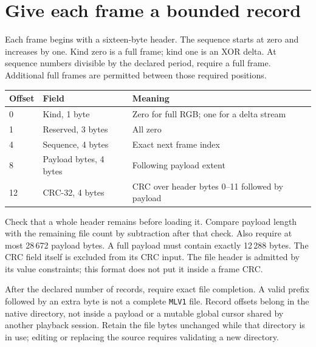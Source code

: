 \section{Give each frame a bounded record}
Each frame begins with a sixteen-byte header. The sequence starts at zero and
increases by one. Kind zero is a full frame; kind one is an XOR delta. At sequence
numbers divisible by the declared period, require a full frame. Additional full
frames are permitted between those required positions.
\begin{longtable}{p{18mm}p{43mm}p{85mm}}
\toprule Offset & Field & Meaning \\\midrule
0 & Kind, 1 byte & Zero for full RGB; one for a delta stream \\
1 & Reserved, 3 bytes & All zero \\
4 & Sequence, 4 bytes & Exact next frame index \\
8 & Payload bytes, 4 bytes & Following payload extent \\
12 & CRC-32, 4 bytes & CRC over header bytes 0--11 followed by payload \\\bottomrule
\end{longtable}
Check that a whole header remains before loading it. Compare payload length with the
remaining file count by subtraction after that check. Also require at most 28\,672
payload bytes. A full payload must contain exactly 12\,288 bytes. The CRC field itself
is excluded from its CRC input. The file header is admitted by its value constraints;
this format does not put it inside a frame CRC.

After the declared number of records, require exact file completion. A valid prefix
followed by an extra byte is not a complete \texttt{MLV1} file. Record offsets belong
in the native directory, not inside a payload or a mutable global cursor shared by
another playback session. Retain the file bytes unchanged while that directory is
in use; editing or replacing the source requires validating a new directory.
